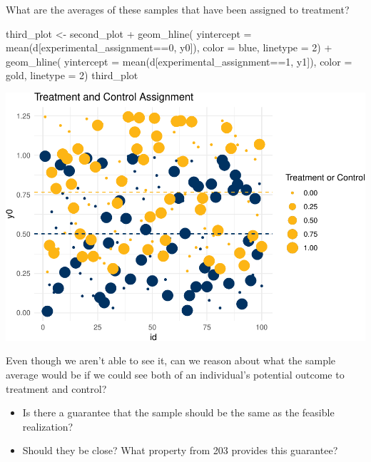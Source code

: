 \documentclass[
]{article}
\newenvironment{Shaded}{\begin{snugshade}}{\end{snugshade}}
\newcommand{\AttributeTok}[1]{\textcolor[rgb]{0.77,0.63,0.00}{#1}}
\newcommand{\DecValTok}[1]{\textcolor[rgb]{0.00,0.00,0.81}{#1}}
\newcommand{\FunctionTok}[1]{\textcolor[rgb]{0.00,0.00,0.00}{#1}}
\newcommand{\NormalTok}[1]{#1}
\newcommand{\OtherTok}[1]{\textcolor[rgb]{0.56,0.35,0.01}{#1}}
\newcommand{\SpecialCharTok}[1]{\textcolor[rgb]{0.00,0.00,0.00}{#1}}
\providecommand{\tightlist}{%
  \setlength{\itemsep}{0pt}\setlength{\parskip}{0pt}}
\begin{document}
What are the averages of these samples that have been assigned to treatment?

\begin{Shaded}
\begin{Highlighting}[]
\NormalTok{third\_plot }\OtherTok{\textless{}{-}}\NormalTok{ second\_plot }\SpecialCharTok{+} 
  \FunctionTok{geom\_hline}\NormalTok{(}
    \AttributeTok{yintercept =} \FunctionTok{mean}\NormalTok{(d[experimental\_assignment}\SpecialCharTok{==}\DecValTok{0}\NormalTok{, y0]), }
    \AttributeTok{color =}\NormalTok{ blue, }
    \AttributeTok{linetype =} \DecValTok{2}\NormalTok{) }\SpecialCharTok{+} 
  \FunctionTok{geom\_hline}\NormalTok{(}
    \AttributeTok{yintercept =} \FunctionTok{mean}\NormalTok{(d[experimental\_assignment}\SpecialCharTok{==}\DecValTok{1}\NormalTok{, y1]), }
    \AttributeTok{color =}\NormalTok{ gold, }
    \AttributeTok{linetype =} \DecValTok{2}\NormalTok{)}
\NormalTok{third\_plot}
\end{Highlighting}
\end{Shaded}

\includegraphics{241-live-session_files/figure-latex/add estimates from unbiased estimator-1.pdf}

Even though we aren't able to see it, can we reason about what the sample average would be if we could see both of an individual's potential outcome to treatment and control?

\begin{itemize}
\tightlist
\item
  Is there a guarantee that the sample should be the same as the feasible realization?
\item
  Should they be close? What property from 203 provides this guarantee?
\end{itemize}
\end{document}
